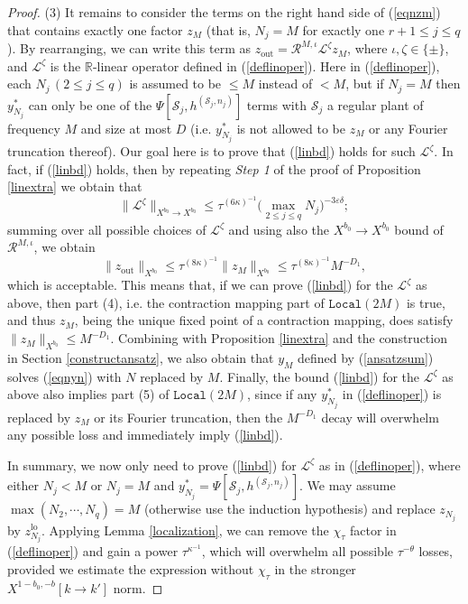 \documentclass[11 pt,reqno]{amsart}
\theoremstyle{definition}
\theoremstyle{remark}
\numberwithin{equation}{section}
\newcommand{\Sc}{\mathcal{S}}
\newcommand{\Rb}{\mathbb{R}}
\newcommand{\Ls}{\mathscr{L}}
\newcommand{\Rs}{\mathscr{R}}
\begin{document}
{\begin{proof}
(3) It remains to consider the terms on the right hand side of (\ref{eqnzm}) that contains exactly one factor $z_M$ (that is, $N_j=M$ for exactly one $r+1\leq j\leq q$). By rearranging, we can write this term as $z_{\mathrm{out}}=\Rs^{M,\iota}\Ls^{\zeta}z_M$, where $\iota,\zeta\in\{\pm\}$, and $\Ls^{\zeta}$ is the $\Rb$-linear operator defined in (\ref{deflinoper}). Here in (\ref{deflinoper}), each $N_j\,(2\leq j\leq q)$ is assumed to be $\leq M$ instead of $<M$, but if $N_j=M$ then $y_{N_j}^*$ can only be one of the $\Psi[\Sc_j,h^{(\Sc_j,n_j)}]$ terms with $\Sc_j$ a regular plant of frequency $M$ and size at most $D$ (i.e. $y_{N_j}^*$ is not allowed to be $z_M$ or any Fourier truncation thereof). Our goal here is to prove that (\ref{linbd}) holds for such $\Ls^\zeta$. In fact, if (\ref{linbd}) holds, then by repeating \emph{Step 1} of the proof of Proposition \ref{linextra} we obtain that
\[\|\Ls^{\zeta}\|_{X^{b_0}\to X^{b_0}}\leq \tau^{(6\kappa)^{-1}}\big(\max_{2\leq j\leq q}N_j\big)^{-3\varepsilon\delta};\] summing over all possible choices of $\Ls^\zeta$ and using also the $X^{b_0}\to X^{b_0}$ bound of $\Rs^{M,\iota}$, we obtain
\[\|z_{\mathrm{out}}\|_{X^{b_0}}\leq\tau^{(8\kappa)^{-1}}\|z_M\|_{X^{b_0}}\leq\tau^{(8\kappa)^{-1}}M^{-D_1},\] which is acceptable. This means that, if we can prove (\ref{linbd}) for the $\Ls^\zeta$ as above, then part (4), i.e. the contraction mapping part of $\mathtt{Local}(2M)$ is true, and thus $z_M$, being the unique fixed point of a contraction mapping, does satisfy $\|z_M\|_{X^{b_0}}\leq M^{-D_1}$. Combining with Proposition \ref{linextra} and the construction in Section \ref{constructansatz}, we also obtain that $y_M$ defined by (\ref{ansatzsum}) solves (\ref{eqnyn}) with $N$ replaced by $M$. Finally, the bound (\ref{linbd}) for the $\Ls^\zeta$ as above also implies part (5) of $\mathtt{Local}(2M)$, since if any $y_{N_j}^*$ in (\ref{deflinoper}) is replaced by $z_M$ or its Fourier truncation, then the $M^{-D_1}$ decay will overwhelm any possible loss and immediately imply (\ref{linbd}).

In summary, we now only need to prove (\ref{linbd}) for $\Ls^\zeta$ as in (\ref{deflinoper}), where either $N_j<M$ or $N_j=M$ and $y_{N_j}^*=\Psi[\Sc_j,h^{(\Sc_j,n_j)}]$. We may assume $\max(N_2,\cdots,N_q)=M$ (otherwise use the induction hypothesis) and replace $z_{N_j}$ by $z_{N_j}^{\mathrm{lo}}$. Applying Lemma \ref{localization}, we can remove the $\chi_\tau$ factor in (\ref{deflinoper}) and gain a power $\tau^{\kappa^{-1}}$, which will overwhelm all possible $\tau^{-\theta}$ losses, provided we estimate the expression without $\chi_\tau$ in the stronger $X^{1-b_0,-b}[k\to k']$ norm.


\end{proof}}
\end{document}
